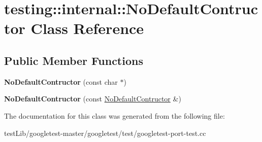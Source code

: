 \hypertarget{classtesting_1_1internal_1_1NoDefaultContructor}{}\section{testing\+:\+:internal\+:\+:No\+Default\+Contructor Class Reference}
\label{classtesting_1_1internal_1_1NoDefaultContructor}
\subsection*{Public Member Functions}
\begin{DoxyCompactItemize}
\item 
\mbox{\label{classtesting_1_1internal_1_1NoDefaultContructor_a34c9cdf833476a9718141dcff931ba42}} 
{\bfseries No\+Default\+Contructor} (const char $\ast$)
\item 
\mbox{\label{classtesting_1_1internal_1_1NoDefaultContructor_acba74b55a8c5341808ecb5b9318eaecf}} 
{\bfseries No\+Default\+Contructor} (const \hyperlink{classtesting_1_1internal_1_1NoDefaultContructor}{No\+Default\+Contructor} \&)
\end{DoxyCompactItemize}


The documentation for this class was generated from the following file\+:\begin{DoxyCompactItemize}
\item 
test\+Lib/googletest-\/master/googletest/test/googletest-\/port-\/test.\+cc\end{DoxyCompactItemize}
